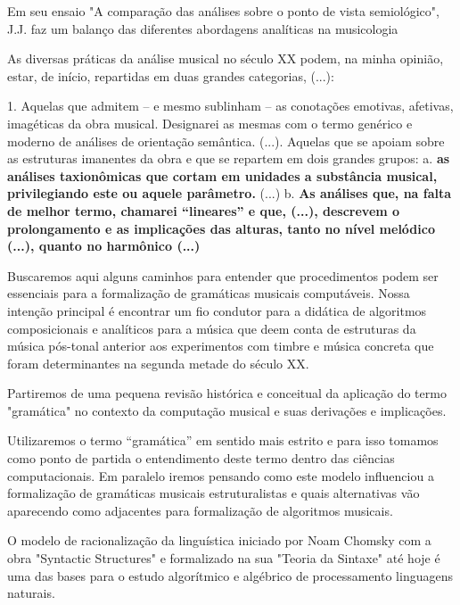 \documentclass[
	12pt,				%
	openright,			%
	twoside,			%
	a4paper,			%
	english,			%
	french,				%
	spanish,			%
	brazil				%
	]{abntex2}
\begin{document}
Em seu ensaio "A comparação das análises sobre o ponto de vista semiológico", J.J.  faz um balanço das diferentes abordagens analíticas na musicologia 

\begin{citacao}
As diversas práticas da análise musical no século XX podem, na minha opinião, estar, de início, repartidas em duas grandes categorias, (...): 

1. Aquelas que admitem – e mesmo sublinham – as conotações emotivas, afetivas, imagéticas da obra musical. Designarei as mesmas com o termo genérico e moderno de análises de orientação semântica. (...). Aquelas que se apoiam sobre as estruturas imanentes da obra e que se repartem em dois grandes grupos: a. \textbf{as análises taxionômicas que cortam em unidades a substância musical, privilegiando este ou aquele parâmetro. }(...) b. \textbf{As análises que, na falta de melhor termo, chamarei “lineares” e que, (...), 
descrevem o prolongamento e as implicações das alturas, tanto no nível melódico (...), quanto no harmônico (...)}
\cite[grifos nossos]{nattiezcomparaccao}
\end{citacao}


Buscaremos aqui alguns caminhos para entender que procedimentos podem ser essenciais para a formalização de gramáticas musicais computáveis. Nossa intenção principal é encontrar um fio condutor para a didática de algoritmos composicionais e analíticos para a música que deem conta de estruturas da música pós-tonal anterior aos experimentos com timbre e música concreta que foram determinantes na segunda metade do século XX.  

Partiremos de uma pequena revisão histórica e conceitual da aplicação do termo "gramática" no contexto da computação musical e suas derivações e implicações.  

Utilizaremos o termo “gramática” em sentido mais estrito e para isso tomamos como ponto de partida o entendimento deste termo dentro das ciências computacionais. Em paralelo iremos pensando como este modelo influenciou a formalização de gramáticas musicais estruturalistas e quais alternativas vão aparecendo como adjacentes para formalização de algoritmos musicais.

O modelo de racionalização da linguística iniciado por Noam Chomsky com a obra "Syntactic Structures" \cite{chomsky1957syntactic} e formalizado na sua "Teoria da Sintaxe"\cite{chomsky1965aspects}  até hoje é uma das bases para o estudo algorítmico e algébrico de processamento linguagens naturais.  
\end{document}
